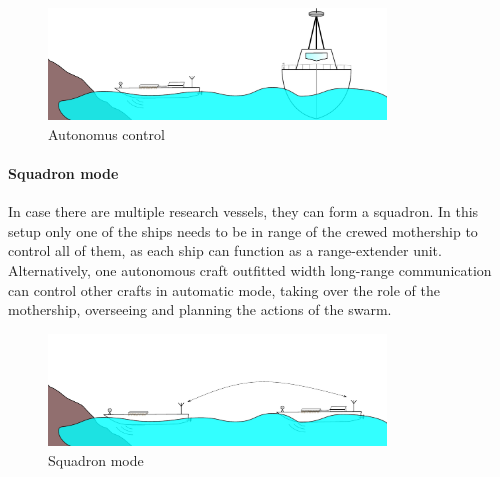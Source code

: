 \begin{figure}[H]
	\centering
	\includegraphics[width=0.8\textwidth]{img/autonomus}
	\caption{Autonomus control}
	\label{fig:autonomus}
\end{figure}

\paragraph{Squadron mode}
In case there are multiple research vessels, they can form a squadron. In this setup only one of the ships needs to be in range of the crewed mothership to control all of them, as each ship can function as a range-extender unit. Alternatively, one autonomous craft outfitted width long-range communication can control other crafts in automatic mode, taking over the role of the mothership, overseeing and planning the actions of the swarm.

\begin{figure}[H]
	\centering
	\includegraphics[width=0.8\textwidth]{img/multiple}
	\caption{Squadron mode}
	\label{fig:multiple}
\end{figure}

